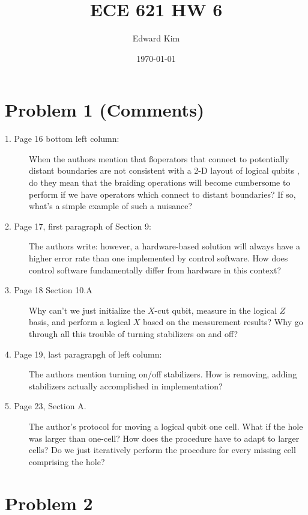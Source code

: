 \documentclass[12pt]{article}%
\begin{document}
\title{ECE 621 HW 6}
\author{Edward Kim}
\date{\today}
\maketitle

\section*{Problem 1 (Comments)}

\begin{description}
  \item [1. Page 16 bottom left column:] When the authors mention that  ßoperators that connect to potentially distant boundaries are not consistent with a 2-D layout of logical qubits , do they mean that the braiding operations will become cumbersome to perform if we have operators which connect to distant boundaries? If so, what's a simple example of such a nuisance?
  \item[2. Page 17, first paragraph of Section 9:] The authors write: however, a hardware-based solution will always have a higher error rate than one implemented by control software. How does control software fundamentally differ from hardware in this context?
  \item[3. Page 18 Section 10.A] Why can't we just initialize the $X$-cut qubit, measure in the logical $Z$ basis, and perform a logical $X$ based on the measurement results? Why go through all this trouble of turning stabilizers on and off?
  \item[4. Page 19, last paragrapgh of left column:] The authors mention turning on/off stabilizers. How is removing, adding stabilizers actually accomplished in implementation?
  \item[5. Page 23, Section A.] The author's protocol for moving a logical qubit one cell. What if the hole was larger than one-cell? How does the procedure have to adapt to larger cells? Do we just iteratively perform the procedure for every missing cell comprising the hole?
\end{description}

\section*{Problem 2}
\end{document}
